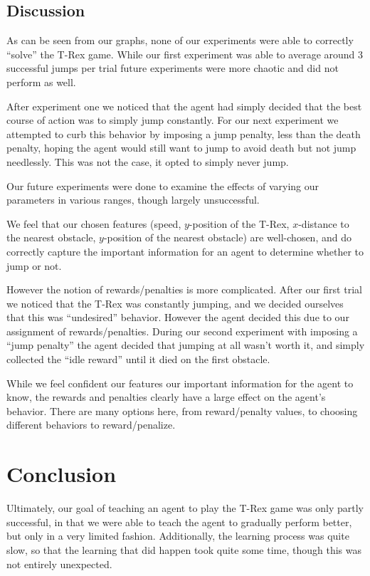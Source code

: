 \documentclass{scrartcl}
\begin{document}
    \subsection{Discussion}
    As can be seen from our graphs, none of our experiments were able to
    correctly ``solve'' the T-Rex game. While our first experiment was able to
    average around 3 successful jumps per trial future experiments were more
    chaotic and did not perform as well.

    After experiment one we noticed that the agent had simply decided that the
    best course of action was to simply jump constantly. For our next experiment
    we attempted to curb this behavior by imposing a jump penalty, less than the
    death penalty, hoping the agent would still want to jump to avoid death but
    not jump needlessly. This was not the case, it opted to simply never jump.

    Our future experiments were done to examine the effects of varying
    our parameters in various ranges, though largely unsuccessful.

    We feel that our chosen features (speed, $y$-position of the T-Rex,
    $x$-distance to the nearest obstacle, $y$-position of the nearest obstacle)
    are well-chosen, and do correctly capture the important information for an
    agent to determine whether to jump or not. 

    However the notion of rewards/penalties is more complicated. After our
    first trial we noticed that the T-Rex was constantly jumping, and we decided
    ourselves that this was ``undesired'' behavior. However the agent decided
    this due to our assignment of rewards/penalties. During our second
    experiment with imposing a ``jump penalty'' the agent decided that jumping
    at all wasn't worth it, and simply collected the ``idle reward'' until it
    died on the first obstacle.

    While we feel confident our features our important information for the agent
    to know, the rewards and penalties clearly have a large effect on the
    agent's behavior. There are many options here, from reward/penalty values,
    to choosing different behaviors to reward/penalize. 

\section{Conclusion}
    Ultimately, our goal of teaching an agent to play the T-Rex game was only
    partly successful, in that we were able to teach the agent to gradually
    perform better, but only in a very limited fashion. Additionally, the
    learning process was quite slow, so that the learning that did happen took
    quite some time, though this was not entirely unexpected.
\end{document}
